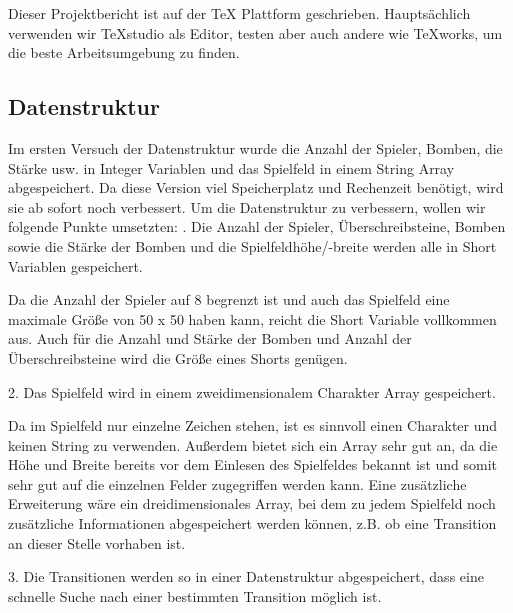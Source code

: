 \documentclass[12pt,a4paper,bibliography=totocnumbered,listof=totocnumbered]{scrartcl}
\begin{document}
Dieser Projektbericht ist auf der TeX Plattform geschrieben. Hauptsächlich verwenden wir TeXstudio als Editor, testen aber auch andere wie TeXworks, um die beste Arbeitsumgebung zu finden.

\subsection{Datenstruktur}
Im ersten Versuch der Datenstruktur wurde die Anzahl der Spieler, Bomben, die Stärke usw. in Integer Variablen und das Spielfeld in einem String Array abgespeichert. Da diese Version viel Speicherplatz und Rechenzeit benötigt, wird sie ab sofort noch verbessert.
Um die Datenstruktur zu verbessern, wollen wir folgende Punkte umsetzten:
. Die Anzahl der Spieler, Überschreibsteine, Bomben sowie die Stärke der Bomben und die Spielfeldhöhe/-breite werden alle in Short Variablen gespeichert. 

Da die Anzahl der Spieler auf 8 begrenzt ist und auch das Spielfeld eine maximale Größe von 50 x 50 haben kann, reicht die Short Variable vollkommen aus. Auch für die Anzahl und Stärke der Bomben und Anzahl der Überschreibsteine wird die Größe eines Shorts genügen.

2. Das Spielfeld wird in einem zweidimensionalem Charakter Array gespeichert.

Da im Spielfeld nur einzelne Zeichen stehen, ist es sinnvoll einen Charakter und keinen String zu verwenden. Außerdem bietet sich ein Array sehr gut an, da die Höhe und Breite bereits vor dem Einlesen des Spielfeldes bekannt ist und somit sehr gut auf die einzelnen Felder zugegriffen werden kann.
Eine zusätzliche Erweiterung wäre ein dreidimensionales Array, bei dem zu jedem Spielfeld noch zusätzliche Informationen abgespeichert werden können, z.B. ob eine Transition an dieser Stelle vorhaben ist.

3. Die Transitionen werden so in einer Datenstruktur abgespeichert, dass eine schnelle Suche nach einer bestimmten Transition möglich ist. 


\newpage
\end{document}
